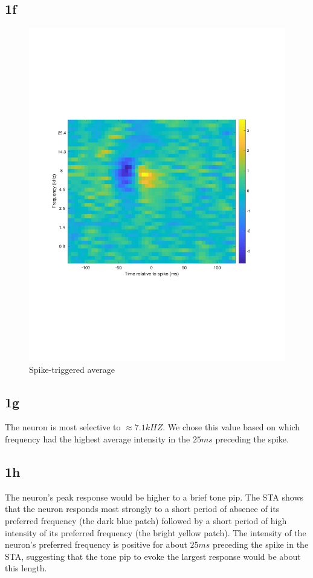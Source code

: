 \documentclass[]{article}
\begin{document}
\subsection*{1f}

\begin{figure}[H]
    \centering
    \includegraphics[width=0.8\linewidth]{problem1f.pdf}
    \caption{Spike-triggered average}
    \label{fig:my_label}
\end{figure}

\subsection*{1g}

The neuron is most selective to $\approx 7.1 kHZ$. We chose this value based on which frequency had the highest average intensity in the $25 ms$ preceding the spike.

\subsection*{1h}

The neuron's peak response would be higher to a brief tone pip. The STA shows that the neuron responds most strongly to a short period of absence of its preferred frequency (the dark blue patch) followed by a short period of high intensity of its preferred frequency (the bright yellow patch). The intensity of the neuron's preferred frequency is positive for about $25ms$ preceding the spike in the STA, suggesting that the tone pip to evoke the largest response would be about this length.
\end{document}

